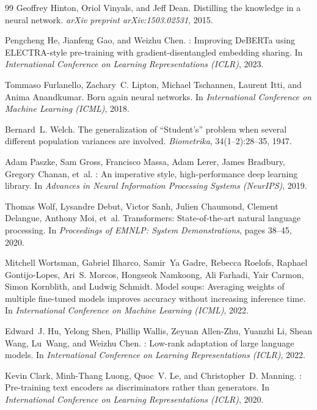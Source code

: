 \documentclass[11pt]{article}
\begin{document}
\begin{thebibliography}{99}
Geoffrey Hinton, Oriol Vinyals, and Jeff Dean.
\newblock Distilling the knowledge in a neural network.
\newblock \emph{arXiv preprint arXiv:1503.02531}, 2015.

Pengcheng He, Jianfeng Gao, and Weizhu Chen.
: Improving {DeBERTa} using {ELECTRA}-style pre-training with gradient-disentangled
  embedding sharing.
\newblock In \emph{International Conference on Learning Representations (ICLR)}, 2023.

Tommaso Furlanello, Zachary~C. Lipton, Michael Tschannen, Laurent Itti, and Anima Anandkumar.
\newblock Born again neural networks.
\newblock In \emph{International Conference on Machine Learning (ICML)}, 2018.

Bernard~L. Welch.
\newblock The generalization of ``{S}tudent's'' problem when several different population variances are involved.
\newblock \emph{Biometrika}, 34(1--2):28--35, 1947.

Adam Paszke, Sam Gross, Francisco Massa, Adam Lerer, James Bradbury, Gregory Chanan, et~al.
: An imperative style, high-performance deep learning library.
\newblock In \emph{Advances in Neural Information Processing Systems (NeurIPS)}, 2019.

Thomas Wolf, Lysandre Debut, Victor Sanh, Julien Chaumond, Clement Delangue, Anthony Moi, et~al.
\newblock Transformers: State-of-the-art natural language processing.
\newblock In \emph{Proceedings of EMNLP: System Demonstrations}, pages 38--45, 2020.

Mitchell Wortsman, Gabriel Ilharco, Samir~Ya Gadre, Rebecca Roelofs, Raphael Gontijo-Lopes, Ari~S. Morcos,
  Hongseok Namkoong, Ali Farhadi, Yair Carmon, Simon Kornblith, and Ludwig Schmidt.
\newblock Model soups: Averaging weights of multiple fine-tuned models improves accuracy without increasing
  inference time.
\newblock In \emph{International Conference on Machine Learning (ICML)}, 2022.

Edward~J. Hu, Yelong Shen, Phillip Wallis, Zeyuan Allen-Zhu, Yuanzhi Li, Shean Wang, Lu~Wang, and Weizhu Chen.
: Low-rank adaptation of large language models.
\newblock In \emph{International Conference on Learning Representations (ICLR)}, 2022.

Kevin Clark, Minh-Thang Luong, Quoc~V. Le, and Christopher~D. Manning.
: Pre-training text encoders as discriminators rather than generators.
\newblock In \emph{International Conference on Learning Representations (ICLR)}, 2020.

\end{thebibliography}
\end{document}
